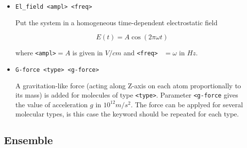 \documentclass{article}
\begin{document}
\begin{itemize}
\item
\verb|El_field <ampl> <freq>|

Put the system in a homogeneous time-dependent electrostatic field 

\begin{equation}
E(t) = A\cos(2\pi\omega t)
\end{equation}

where \verb|<ampl>|$=A$ is given in $V/cm$ and \verb|<freq> | $ = \omega$ 
in $Hz$.

\item
\verb|G-force <type> <g-force>|

A gravitation-like force (acting along Z-axis on each atom proportionally 
to its mass) is added for molecules of type \verb|<type>|. Parameter
\verb|<g-force| gives the value of acceleration $g$ in $10^{12} m/s^2$. 
The force can be applyed for several molecular types, is this case the keyword 
should be repeated for each type.

\end{itemize}


\subsection{Ensemble}
\end{document}

